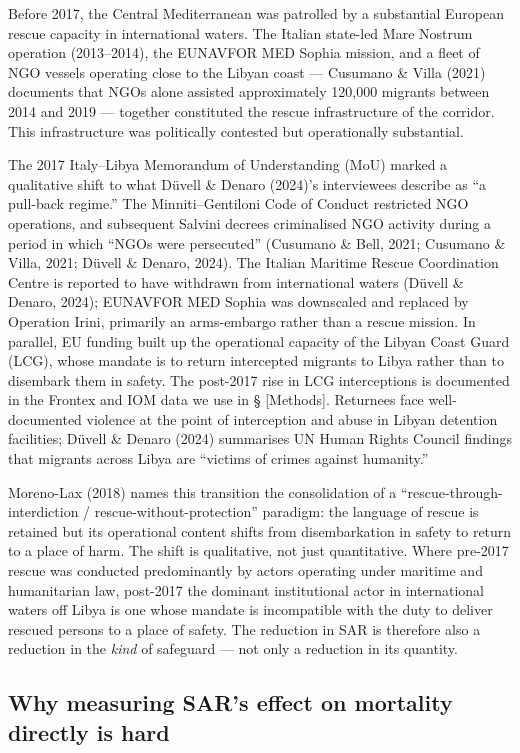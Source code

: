 \documentclass[
  11pt,
  a4paper,
]{article}
\begin{document}
Before 2017, the Central Mediterranean was patrolled by a substantial
European rescue capacity in international waters. The Italian state-led
Mare Nostrum operation (2013--2014), the EUNAVFOR MED Sophia mission,
and a fleet of NGO vessels operating close to the Libyan coast ---
Cusumano \& Villa (2021) documents that NGOs alone assisted
approximately 120,000 migrants between 2014 and 2019 --- together
constituted the rescue infrastructure of the corridor. This
infrastructure was politically contested but operationally substantial.

The 2017 Italy--Libya Memorandum of Understanding (MoU) marked a
qualitative shift to what Düvell \& Denaro (2024)'s interviewees
describe as ``a pull-back regime.'' The Minniti--Gentiloni Code of
Conduct restricted NGO operations, and subsequent Salvini decrees
criminalised NGO activity during a period in which ``NGOs were
persecuted'' (Cusumano \& Bell, 2021; Cusumano \& Villa, 2021; Düvell \&
Denaro, 2024). The Italian Maritime Rescue Coordination Centre is
reported to have withdrawn from international waters (Düvell \& Denaro,
2024); EUNAVFOR MED Sophia was downscaled and replaced by Operation
Irini, primarily an arms-embargo rather than a rescue mission. In
parallel, EU funding built up the operational capacity of the Libyan
Coast Guard (LCG), whose mandate is to return intercepted migrants to
Libya rather than to disembark them in safety. The post-2017 rise in LCG
interceptions is documented in the Frontex and IOM data we use in §
{[}Methods{]}. Returnees face well-documented violence at the point of
interception and abuse in Libyan detention facilities; Düvell \& Denaro
(2024) summarises UN Human Rights Council findings that migrants across
Libya are ``victims of crimes against humanity.''

Moreno-Lax (2018) names this transition the consolidation of a
``rescue-through-interdiction / rescue-without-protection'' paradigm:
the language of rescue is retained but its operational content shifts
from disembarkation in safety to return to a place of harm. The shift is
qualitative, not just quantitative. Where pre-2017 rescue was conducted
predominantly by actors operating under maritime and humanitarian law,
post-2017 the dominant institutional actor in international waters off
Libya is one whose mandate is incompatible with the duty to deliver
rescued persons to a place of safety. The reduction in SAR is therefore
also a reduction in the \emph{kind} of safeguard --- not only a
reduction in its quantity.

\subsection{Why measuring SAR's effect on mortality directly is
hard}\label{why-measuring-sars-effect-on-mortality-directly-is-hard}
\end{document}
